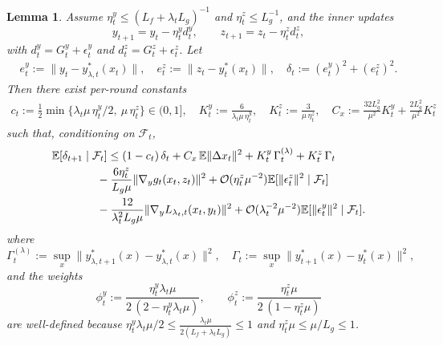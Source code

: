 \documentclass{uai2026} %
\newtheorem{lemma}{Lemma}[section]
\newcommand{\EE}{\mathbb{E}}
\newcommand{\F}{\mathcal{F}}
\begin{document}
\iffalse
\begin{lemma}\label{lem:inner-stoch-correct}
Assume $\eta_t^y\le (L_f+\lambda_t L_g)^{-1}$ and $\eta_t^z\le L_g^{-1}$, and the inner updates
\[
y_{t+1}=y_t-\eta_t^y d_t^y,\qquad z_{t+1}=z_t-\eta_t^z d_t^z,
\]
with $d_t^y=G_t^y+\epsilon_t^y$ and $d_t^z=G_t^z+\epsilon_t^z$. Let
\begin{align}\label{eq_def_delta}
    e_t^y:=\|y_t-y^{*}_{\lambda,t}(x_t)\|,\quad e_t^z:=\|z_t-y_t^{*}(x_t)\|,\quad
\delta_t:= (e_t^y)^2+(e_t^z)^2.
\end{align}
Then there exist per-round constants
\begin{align}\label{eq_c_t_K_t_C_x}
    c_t:=\tfrac12\min\{\lambda_t\mu\,\eta_t^y/2,\ \mu\,\eta_t^z\}\in(0,1],\quad
K_t^y:= \frac{6}{\lambda_t\mu\,\eta_t^y},\quad
K_t^z:= \frac{3}{\mu\,\eta_t^z},\quad C_{x}:=\frac{32L_{g}^{2}}{\mu^{2}}K_{t}^{y}+\frac{2L_{g}^{2}}{\mu^{2}}K_{t}^{z}
\end{align}
such that, conditioning on $\mathcal{F}_t$,
\begin{align}
    \MoveEqLeft[4]\EE[\delta_{t+1}\mid\F_t]
\le(1-c_t)\,\delta_t
+C_x\,\EE\|\Delta x_t\|^2
+K_t^y\,\Gamma_t^{(\lambda)}+K_t^z\,\Gamma_t\nonumber\\
&-\frac{6\eta_{t}^{z}}{L_{g}\mu}\|\nabla_{y} g_{t}(x_{t},z_{t})\|^{2}+\mathcal{O}(\eta_{t}^{z}\mu^{-2})\mathbb{E}[\|\epsilon_{t}^{z}\|^{2}\mid \mathcal{F}_{t}]\nonumber\\
&-\frac{12}{\lambda_{t}^{2}L_{g}\mu}\|\nabla_{y} L_{\lambda_{t},t}(x_{t},y_{t})\|^{2}+\mathcal{O}(\lambda_{t}^{-2}\mu^{-2})\mathbb{E}[\|\epsilon_{t}^{y}\|^{2}\mid \mathcal{F}_{t}].
\end{align}
where
\[
\Gamma_t^{(\lambda)}:=\sup_x\|y^{*}_{\lambda,t+1}(x)-y^{*}_{\lambda,t}(x)\|^2,\quad
\Gamma_t:=\sup_x\|y^{*}_{t+1}(x)-y^{*}_t(x)\|^2,
\]
and the weights
\[
\phi_t^y:=\frac{\eta_t^y\lambda_t\mu}{2\,(2-\eta_t^y\lambda_t\mu)},\qquad
\phi_t^z:=\frac{\eta_t^z\mu}{2\,(1-\eta_t^z\mu)}
\]
are well-defined because $\eta_t^y\lambda_t\mu/2\le \frac{\lambda_{t}\mu}{2(L_{f}+\lambda_{t}L_{g})}\le 1$ and $\eta_t^z\mu\le \mu/L_g\le 1$.
\end{lemma}
\end{document}
